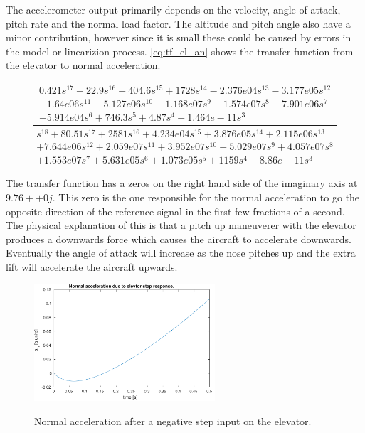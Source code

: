 The accelerometer output primarily depends on the velocity, angle of attack, pitch rate and the normal load factor. The altitude and pitch angle also have a minor contribution, however since it is small these could be caused by errors in the model or linearizion process. \autoref{eq:tf_el_an} shows the transfer function from the elevator to normal acceleration.

\begin{equation}
    \label{eq:tf_el_an}
    \frac{
    \begin{matrix}
        0.421 s^{17} + 22.9 s^{16} + 404.6 s^{15} + 1728 s^{14} - 2.376e04 s^{13} - 3.177e05 s^{12} \\
        - 1.64e06 s^{11} - 5.127e06 s^{10} - 1.168e07 s^{9} - 1.574e07 s^{8} - 7.901e06 s^{7} \\
        - 5.914e04 s^{6} +  746.3 s^{5} + 4.87 s^{4} - 1.464e-11 s^{3}
    \end{matrix}
    }{
    \begin{matrix}
        s^{18} + 80.51 s^{17} + 2581 s^{16} + 4.234e04 s^{15} + 3.876e05 s^{14} + 2.115e06 s^{13} \\
        + 7.644e06 s^{12} + 2.059e07 s^{11} + 3.952e07 s^{10} + 5.029e07 s^{9} + 4.057e07 s^{8} \\
        + 1.553e07 s^{7} + 5.631e05 s^{6} + 1.073e05 s^{5} + 1159 s^{4} - 8.86e-11 s^{3}
    \end{matrix}
    }
\end{equation}

The transfer function has a zeros on the right hand side of the imaginary axis at $9.76++0j$. This zero is the one responsible for the normal acceleration to go the opposite direction of the reference signal in the first few fractions of a second. The physical explanation of this is that a pitch up maneuverer with the elevator produces a downwards force which causes the aircraft to accelerate downwards. Eventually the angle of attack will increase as the nose pitches up and the extra lift will accelerate the aircraft upwards.

\begin{figure}[h]
    \centering
    \includegraphics[width=0.6\textwidth]{figures/an_elev_step}
    \label{fig:an_elev_step}
    \caption{Normal acceleration after a negative step input on the elevator.}
\end{figure}

